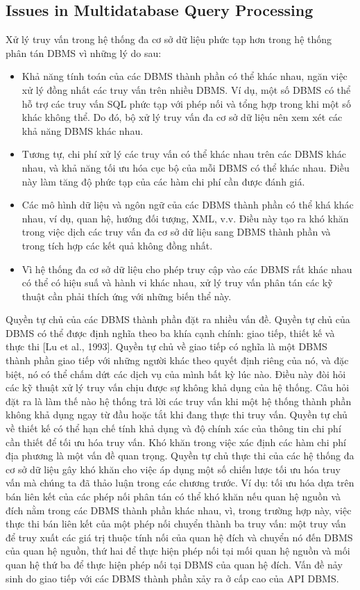 \documentclass[a4paper]{article}
\begin{document}
\subsection{Issues in Multidatabase Query Processing}
Xử lý truy vấn trong hệ thống đa cơ sở dữ liệu phức tạp hơn trong hệ thống phân tán DBMS vì những lý do sau:
\begin{itemize}
    \item Khả năng tính toán của các DBMS thành phần có thể khác nhau, ngăn việc xử lý đồng nhất các truy vấn trên nhiều DBMS. Ví dụ, một số DBMS có thể hỗ trợ các truy vấn SQL phức tạp với phép nối và tổng hợp trong khi một số khác không thể. Do đó, bộ xử lý truy vấn đa cơ sở dữ liệu nên xem xét các khả năng DBMS khác nhau.
    \item Tương tự, chi phí xử lý các truy vấn có thể khác nhau trên các DBMS khác nhau, và khả năng tối ưu hóa cục bộ của mỗi DBMS có thể khác nhau. Điều này làm tăng độ phức tạp của các hàm chi phí cần được đánh giá.
    \item Các mô hình dữ liệu và ngôn ngữ của các DBMS thành phần có thể khá khác nhau, ví dụ, quan hệ, hướng đối tượng, XML, v.v. Điều này tạo ra khó khăn trong việc dịch các truy vấn đa cơ sở dữ liệu sang DBMS thành phần và trong tích hợp các kết quả không đồng nhất.
    \item Vì hệ thống đa cơ sở dữ liệu cho phép truy cập vào các DBMS rất khác nhau có thể có hiệu suấ và hành vi khác nhau, xử lý truy vấn phân tán các kỹ thuật cần phải thích ứng với những biến thể này.
\end{itemize}
Quyền tự chủ của các DBMS thành phần đặt ra nhiều vấn đề. Quyền tự chủ của DBMS có thể được định nghĩa theo ba khía cạnh chính: giao tiếp, thiết kế và thực thi [Lu et al., 1993]. Quyền tự chủ về giao tiếp có nghĩa là một DBMS thành phần giao tiếp với những người khác theo quyết định riêng của nó, và đặc biệt, nó có thể chấm dứt các dịch vụ của mình bất kỳ lúc nào. Điều này đòi hỏi các kỹ thuật xử lý truy vấn chịu được sự không khả dụng của hệ thống. Câu hỏi đặt ra là làm thế nào hệ thống trả lời các truy vấn khi một hệ thống thành phần không khả dụng ngay từ đầu hoặc tắt khi đang thực thi truy vấn. Quyền tự chủ về thiết kế có thể hạn chế tính khả dụng và độ chính xác của thông tin chi phí cần thiết để tối ưu hóa truy vấn. Khó khăn trong việc xác định các hàm chi phí địa phương là một vấn đề quan trọng. Quyền tự chủ thực thi của các hệ thống đa cơ sở dữ liệu gây khó khăn cho việc áp dụng một số chiến lược tối ưu hóa truy vấn mà chúng ta đã thảo luận trong các chương trước. Ví dụ: tối ưu hóa dựa trên bán liên kết của các phép nối phân tán có thể khó khăn nếu quan hệ nguồn và đích nằm trong các DBMS thành phần khác nhau, vì, trong trường hợp này, việc thực thi bán liên kết của một phép nối chuyển thành ba truy vấn: một truy vấn để truy xuất các giá trị thuộc tính nối của quan hệ đích và chuyển nó đến DBMS của quan hệ nguồn, thứ hai để thực hiện phép nối tại mối quan hệ nguồn và mối quan hệ thứ ba để thực hiện phép nối tại DBMS của quan hệ đích. Vấn đề nảy sinh do giao tiếp với các DBMS thành phần xảy ra ở cấp cao của API DBMS.
\end{document}
